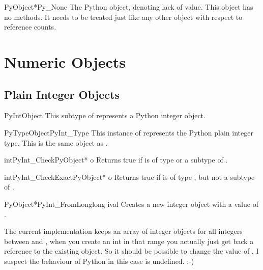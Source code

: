 \begin{cvardesc}{PyObject*}{Py_None}
  The Python  object, denoting lack of value.  This object
  has no methods.  It needs to be treated just like any other object
  with respect to reference counts.
\end{cvardesc}


\section{Numeric Objects \label{numericObjects}}



\subsection{Plain Integer Objects \label{intObjects}}

\begin{ctypedesc}{PyIntObject}
  This subtype of  represents a Python integer
  object.
\end{ctypedesc}

\begin{cvardesc}{PyTypeObject}{PyInt_Type}
  This instance of  represents the Python plain
  integer type.  This is the same object as .
\end{cvardesc}

\begin{cfuncdesc}{int}{PyInt_Check}{PyObject* o}
  Returns true if  is of type  or a subtype
  of .
\end{cfuncdesc}

\begin{cfuncdesc}{int}{PyInt_CheckExact}{PyObject* o}
  Returns true if  is of type , but not a
  subtype of .
\end{cfuncdesc}

\begin{cfuncdesc}{PyObject*}{PyInt_FromLong}{long ival}
  Creates a new integer object with a value of .

  The current implementation keeps an array of integer objects for all
  integers between  and , when you create an int in
  that range you actually just get back a reference to the existing
  object. So it should be possible to change the value of .  I
  suspect the behaviour of Python in this case is undefined. :-)
\end{cfuncdesc}


